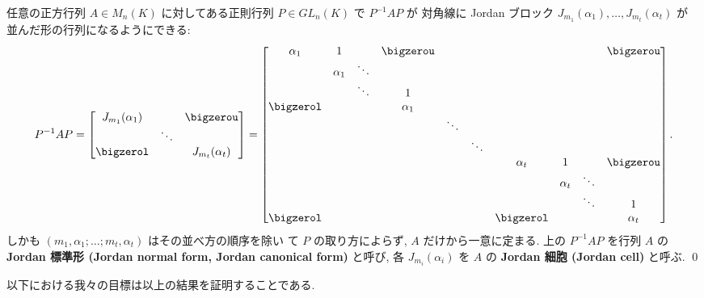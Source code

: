 \documentclass[12pt,twoside]{jarticle}
\begin{document}
\begin{theorem}
\label{theorem:Jordan-normal-form}
  任意の正方行列 $A\in M_n(K)$ に対してある正則行列 $P\in GL_n(K)$ 
  で $P^{-1}AP$ が
  対角線に Jordan ブロック $J_{m_1}(\alpha_1),\dots,J_{m_t}(\alpha_t)$ が
  並んだ形の行列になるようにできる:
  {\small
  \begin{equation*}
    P^{-1}AP =
    \begin{bmatrix}
      J_{m_1}(\alpha_1) &        & \bigzerou \\
                        & \ddots & \\
      \bigzerol         &        & J_{m_t}(\alpha_t) \\
    \end{bmatrix}
    =
    \begin{bmatrix}
      \alpha_1  & 1        &        & \bigzerou & & & & & & \bigzerou \\
                & \alpha_1 & \ddots &           & & & & & & \\
                &          & \ddots & 1         & & & & & & \\
      \bigzerol &          &        & \alpha_1  & & & & & & \\
                & & & & \ddots & & & & \\
                & & & & & \ddots & & & \\
                & & & & & & \alpha_t  & 1        &        & \bigzerou \\
                & & & & & &           & \alpha_t & \ddots & \\
                & & & & & &           &          & \ddots & 1 \\
      \bigzerol & & & & & & \bigzerol &          &        & \alpha_t \\
    \end{bmatrix}.
  \end{equation*}
  }しかも $(m_1,\alpha_1;\dots;m_t,\alpha_t)$ はその並べ方の順序を除い
  て $P$ の取り方によらず, $A$ だけから一意に定まる.
  上の $P^{-1}AP$ を行列 $A$ の
  {\bf Jordan 標準形 (Jordan normal form, Jordan canonical form)} 
  と呼び, 各 $J_{m_i}(\alpha_i)$ を $A$ の 
  {\bf Jordan 細胞 (Jordan cell)} と呼ぶ.
  \qed
\end{theorem}


以下における我々の目標は以上の結果を証明することである.

\end{document}
